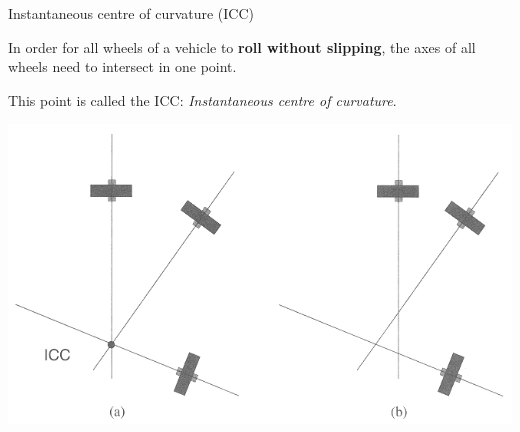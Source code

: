 \documentclass[compress]{beamer}
\begin{document}
\begin{frame}{Instantaneous centre of curvature (ICC)}

In order for all wheels of a vehicle to \textbf{roll without
    slipping}, the axes of all wheels need to intersect in one point.

    This point is called the ICC: \emph{Instantaneous centre of curvature}.

    \begin{center}
        \includegraphics[width=0.7\linewidth]{icc}
    \end{center}
\end{frame}
\end{document}
